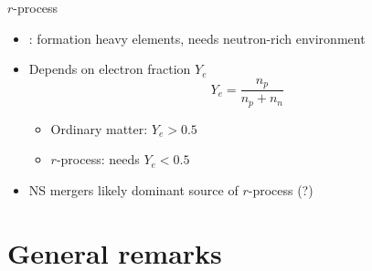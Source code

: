 \documentclass[usenames,dvipsnames,t]{beamer}
\begin{document}
\begin{frame}{$r$-process}
  \def\x{3mm}

\begin{itemize}
  \item {}: formation heavy elements, needs neutron-rich environment
  
  \vspace{\x}
  
  \item Depends on electron fraction $Y_e$
  \begin{equation*}
    Y_e = \frac{n_p}{n_p + n_n} \, 
  \end{equation*}
  \begin{itemize}
    \item Ordinary matter: $Y_e > 0.5$
    \item $r$-process: needs $Y_e < 0.5$
  \end{itemize}

  \vspace{\x}
  
  \item NS mergers likely dominant source of $r$-process (?)
\end{itemize}
\end{frame}

\section{General remarks}
\end{document}
